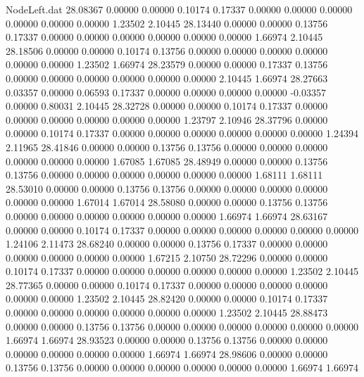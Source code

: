 \begin{filecontents}{NodeLeft.dat}
  28.08367    0.00000    0.00000     0.10174    0.17337    0.00000    0.00000    0.00000    0.00000    0.00000    0.00000    1.23502    2.10445
  28.13440    0.00000    0.00000     0.13756    0.17337    0.00000    0.00000    0.00000    0.00000    0.00000    0.00000    1.66974    2.10445
  28.18506    0.00000    0.00000     0.10174    0.13756    0.00000    0.00000    0.00000    0.00000    0.00000    0.00000    1.23502    1.66974
  28.23579    0.00000    0.00000     0.17337    0.13756    0.00000    0.00000    0.00000    0.00000    0.00000    0.00000    2.10445    1.66974
  28.27663    0.03357    0.00000     0.06593    0.17337    0.00000    0.00000    0.00000    0.00000   -0.03357    0.00000    0.80031    2.10445
  28.32728    0.00000    0.00000     0.10174    0.17337    0.00000    0.00000    0.00000    0.00000    0.00000    0.00000    1.23797    2.10946
  28.37796    0.00000    0.00000     0.10174    0.17337    0.00000    0.00000    0.00000    0.00000    0.00000    0.00000    1.24394    2.11965
  28.41846    0.00000    0.00000     0.13756    0.13756    0.00000    0.00000    0.00000    0.00000    0.00000    0.00000    1.67085    1.67085
  28.48949    0.00000    0.00000     0.13756    0.13756    0.00000    0.00000    0.00000    0.00000    0.00000    0.00000    1.68111    1.68111
  28.53010    0.00000    0.00000     0.13756    0.13756    0.00000    0.00000    0.00000    0.00000    0.00000    0.00000    1.67014    1.67014
  28.58080    0.00000    0.00000     0.13756    0.13756    0.00000    0.00000    0.00000    0.00000    0.00000    0.00000    1.66974    1.66974
  28.63167    0.00000    0.00000     0.10174    0.17337    0.00000    0.00000    0.00000    0.00000    0.00000    0.00000    1.24106    2.11473
  28.68240    0.00000    0.00000     0.13756    0.17337    0.00000    0.00000    0.00000    0.00000    0.00000    0.00000    1.67215    2.10750
  28.72296    0.00000    0.00000     0.10174    0.17337    0.00000    0.00000    0.00000    0.00000    0.00000    0.00000    1.23502    2.10445
  28.77365    0.00000    0.00000     0.10174    0.17337    0.00000    0.00000    0.00000    0.00000    0.00000    0.00000    1.23502    2.10445
  28.82420    0.00000    0.00000     0.10174    0.17337    0.00000    0.00000    0.00000    0.00000    0.00000    0.00000    1.23502    2.10445
  28.88473    0.00000    0.00000     0.13756    0.13756    0.00000    0.00000    0.00000    0.00000    0.00000    0.00000    1.66974    1.66974
  28.93523    0.00000    0.00000     0.13756    0.13756    0.00000    0.00000    0.00000    0.00000    0.00000    0.00000    1.66974    1.66974
  28.98606    0.00000    0.00000     0.13756    0.13756    0.00000    0.00000    0.00000    0.00000    0.00000    0.00000    1.66974    1.66974

\end{filecontents}
